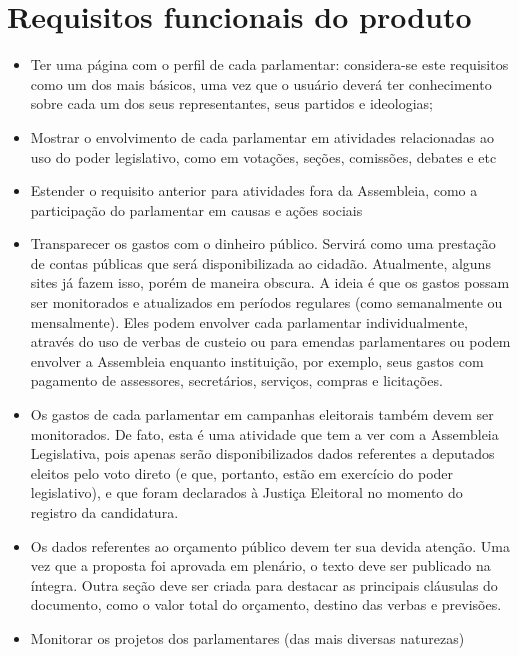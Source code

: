 \documentclass[12pt, a4paper]{article}
\begin{document}
    \section{Requisitos funcionais do produto}
    \begin{itemize}
    \item Ter uma página com o perfil de cada parlamentar: considera-se este
        requisitos como um dos mais básicos, uma vez que o usuário deverá ter
        conhecimento sobre cada um dos seus representantes, seus partidos e
        ideologias;
    \item Mostrar o envolvimento de cada parlamentar em atividades relacionadas
        ao uso do poder legislativo, como em votações, seções, comissões,
        debates e etc
    \item Estender o requisito anterior para atividades fora da Assembleia,
        como a participação do parlamentar em causas e ações sociais
    \item Transparecer os gastos com o dinheiro público. Servirá como uma
        prestação de contas públicas que será disponibilizada ao cidadão.
        Atualmente, alguns sites já fazem isso, porém de maneira obscura. A
        ideia é que os gastos possam ser monitorados e atualizados em períodos
        regulares (como semanalmente ou mensalmente). Eles podem envolver cada
        parlamentar individualmente, através do uso de verbas de custeio ou
        para emendas parlamentares ou podem envolver a Assembleia enquanto
        instituição, por exemplo, seus gastos com pagamento de assessores,
        secretários, serviços, compras e licitações.
    \item Os gastos de cada parlamentar em campanhas eleitorais também devem
        ser monitorados. De fato, esta é uma atividade que tem a ver com a
        Assembleia Legislativa, pois apenas serão disponibilizados dados
        referentes a deputados eleitos pelo voto direto (e que, portanto, estão
        em exercício do poder legislativo), e que foram declarados à Justiça
        Eleitoral no momento do registro da candidatura.
    \item Os dados referentes ao orçamento público devem ter sua devida
        atenção. Uma vez que a proposta foi aprovada em plenário, o texto deve
        ser publicado na íntegra. Outra seção deve ser criada para destacar as
        principais cláusulas do documento, como o valor total do orçamento,
        destino das verbas e previsões.
    \item Monitorar os projetos dos parlamentares (das mais diversas naturezas)

\end{itemize}
\end{document}
